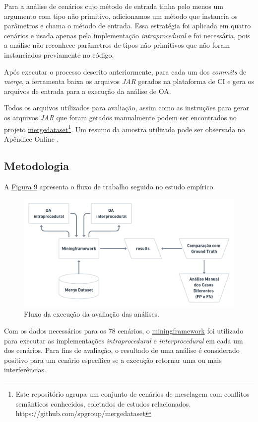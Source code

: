 Para a análise de cenários cujo método de entrada tinha pelo menos um argumento com tipo não primitivo, adicionamos um método que instancia os parâmetros e chama o método de entrada. Essa estratégia foi aplicada em quatro cenários e usada apenas pela implementação \emph{intraprocedural} e foi necessária, pois a análise não reconhece parâmetros de tipos não primitivos que não foram instanciados previamente no código. 

Após executar o processo descrito anteriormente, para cada um dos \emph{commits} de \emph{merge}, a ferramenta baixa os arquivos \emph{JAR} gerados na plataforma de CI e gera os arquivos de entrada para a execução da análise de OA.

Todos os arquivos utilizados para avaliação, assim como as instruções para gerar os arquivos \emph{JAR} que foram gerados manualmente podem ser encontrados no projeto \href{https://github.com/spgroup/mergedataset}{mergedataset}\footnote{Este repositório agrupa um conjunto de cenários de mesclagem com conflitos semânticos conhecidos, coletados de estudos relacionados. https://github.com/spgroup/mergedataset}. Um resumo da amostra utilizada pode ser observada no Apêndice Online .

\subsection{Metodologia}
\label{sec:metodologia}

A \hyperref[fig:fluxo-execucao]{Figura 9} apresenta o fluxo de trabalho seguido no estudo empírico.

\begin{figure}[!h]
    \centering
    \includegraphics[width=0.8\linewidth]{images/Fluxo da avaliação.png}
    \caption{Fluxo da execução da avaliação das análises.}
    \label{fig:fluxo-execucao}
\end{figure}


Com os dados necessários para os 78 cenários, o \href{https://github.com/spgroup/miningframework}{miningframework} foi utilizado para executar as implementações  \emph{intraprocedural} e  \emph{interprocedural} em cada um dos cenários. Para fins de avaliação, o resultado de uma análise é considerado positivo para um cenário específico se a execução retornar uma ou mais interferências.

